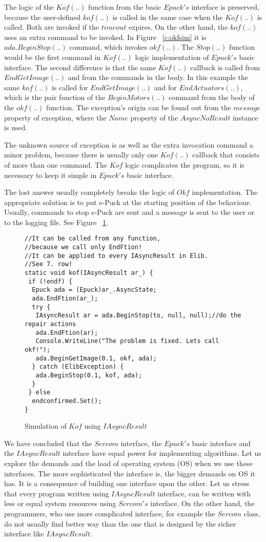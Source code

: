 	The logic of the $Kof(..)$ function from the basic $Epuck's$ interface is preserved, because the user-defined
	$kof(..)$ is called in the same case when the $Kof(..)$ is called. Both are invoked if the $timeout$ expires.
	On the other hand, the $kof(..)$ uses an extra command to be invoked. In Figure ~\ref{c:okfsim} it
	is $ada.BeginStop(..)$ command, which invokes $okf(..)$. The $Stop(..)$ function would be the first command
	in $Kof(..)$ logic implementation of $Epuck's$ basic interface.
	The second difference is that the same $Kof(..)$ callback is called from $EndGetImage(..)$ and from the
	commands in the body. In this example the same $kof(..)$ is called for $EndGetImage(..)$ and 
	for $EndActuators(..)$, which is the pair function of the $BeginMotors(..)$ 
	command from the body of the $okf(..)$ function.
	The exception's origin can be found out from the $message$ property of exception, 
	where the $Name$ property of the $AsyncNoResult$ instance is used.

	The unknown source of exception is as well as the extra invocation command a minor problem, because
	there is usually only one $Kof(..)$ callback that consists of more than one command. 
	The $Kof$ logic complicates the program, so it is necessary to keep it simple in $Epuck's$ basic interface.

	The lost answer usually completely breaks the logic of $Okf$ implementation.
	The appropriate solution is to put e-Puck
	at the starting position of the behaviour. Usually, commands to stop e-Puck are sent 
	and a message is sent to the user or to the logging file.
	See Figure ~\ref{iasynckof}.

\begin{figure}[!hbp]
\begin{lstlisting}
//It can be called from any function,
//because we call only EndFtion!
//It can be applied to every IAsyncResult in Elib.
//See 7. row!
static void kof(IAsyncResult ar_) {
 if (!endf) {
  Epuck ada = (Epuck)ar_.AsyncState;
  ada.EndFtion(ar_);
  try {
   IAsyncResult ar = ada.BeginStop(to, null, null);//do the repair actions
   ada.EndFtion(ar);
   Console.WriteLine("The problem is fixed. Lets call okf!");
   ada.BeginGetImage(0.1, okf, ada);
  } catch (ElibException) {
   ada.BeginStop(0.1, kof, ada);
  }
 } else
  endconfirmed.Set();
}
\end{lstlisting}
\caption{Simulation of $Kof$ using $IAsyncResult$}
\label{iasynckof}
\end{figure}

	We have concluded that the $Sercom$ interface, the $Epuck's$ basic interface and 
	the $IAsyncResult$ interface have equal power for implementing algorithms.
	Let us explore the demands and the load of operating system (OS) when we use these interfaces.
	The more sophisticated the interface is, the bigger demands on OS it has.
	It is a consequence of building one interface upon the other.
	Let us stress that every program written using $IAsyncResult$ interface, 
	can be written with less or equal system resources using $Sercom's$
	interface. On the other hand, the programmers, 
	who use more complicated interface, for example the $Sercom$ class, do not usually find better way 
	than the one that is designed by the richer interface like $IAsyncResult$.


